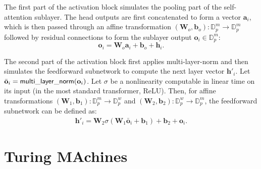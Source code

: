 The first part of the activation block simulates the pooling part of the self-attention sublayer.
The head outputs are first concatenated to form a vector $\mathbf a_i$, which is then passed through an affine transformation $(\mathbf W_o, \mathbf b_o) : \mathbb D_p^m \to \mathbb D_p^m$ followed by residual connections to form the sublayer output $\mathbf o_i \in \mathbb D_p^m$:
\begin{equation*}
    \mathbf o_i = \mathbf W_o \mathbf a_i + \mathbf b_o + \mathbf h_i .
\end{equation*}

The second part of the activation block first applies multi-layer-norm and then simulates the feedforward subnetwork to compute the next layer vector $\mathbf h'_i$.
Let $\bar{\mathbf o}_i = \mathsf{multi\_layer\_norm}(\mathbf o_i)$.
Let $\sigma$ be a nonlinearity computable in linear time on its input (in the most standard transformer, ReLU). Then, for affine transformations $(\mathbf W_1, \mathbf b_1) : \mathbb D_p^m \to \mathbb D_p^w$ and $(\mathbf W_2, \mathbf b_2) : \mathbb D_p^w \to \mathbb D_p^m$, the feedforward subnetwork can be defined as:
\begin{align*}
    \mathbf h'_i = \mathbf W_2 \sigma(\mathbf W_1 \bar{\mathbf o}_i + \mathbf b_1) + \mathbf b_2 + \mathbf o_i .
\end{align*}

\section{Turing MAchines} \label{app:turing-machines}

